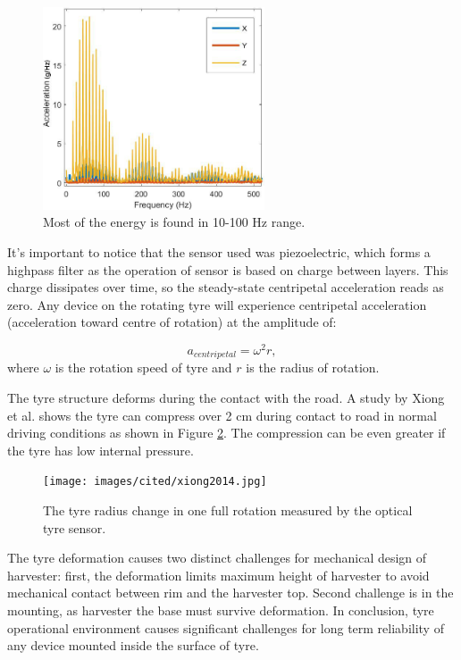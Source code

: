\begin{figure}[htb]
\begin{center}
\includegraphics[height=6cm]{images/matlab_figures/fft.jpg}
\end{center}
\caption{Most of the energy is found in 10-100 Hz range.}
\label{80_FFT_zoom}
\end{figure}

It's important to notice that the sensor used was piezoelectric, which forms a highpass filter as the operation of sensor is based on charge between layers. This charge dissipates over time, so the steady-state centripetal acceleration reads as zero. Any device on the rotating tyre will experience centripetal acceleration (acceleration toward centre of rotation) at the amplitude of: 

\begin{equation}
  a_{centripetal} = \omega^2 r,
\end{equation}
where $\omega$ is the rotation speed of tyre and $r$ is the radius of rotation.

The tyre structure deforms during the contact with the road. A study by Xiong et al. \cite{Xiong2014} shows the tyre can compress over 2 cm during contact to road in normal driving conditions as shown in Figure \ref{fig:deformation}. The compression can be even greater if the tyre has low internal pressure. 

\begin{figure}[htb]
    \begin{center}
    \texttt{[image: images/cited/xiong2014.jpg]}
    \end{center}
    \caption{\label{fig:deformation} The tyre radius change in one full rotation measured by the optical tyre sensor. \cite{Xiong2014}}
\end{figure}

The tyre deformation causes two distinct challenges for mechanical design of harvester: first, the deformation limits maximum height of harvester to avoid mechanical contact between rim and the harvester top. Second challenge is in the mounting, as harvester the base must survive deformation. In conclusion, tyre operational environment causes significant challenges for long term reliability of any device mounted inside the surface of tyre. 

